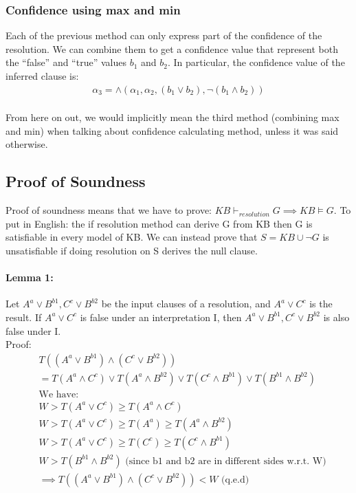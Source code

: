 \documentclass[part1.tex]{subfiles}
\begin{document}
\subsubsection{Confidence using max and min}
Each of the previous method can only express part of the confidence of the resolution. We can combine
them to get a confidence value that represent both the ``false'' and ``true'' values \(b_1\) and 
\(b_2\). In particular, the confidence value of the inferred clause is:
\begin{align*}
	{\alpha}_3 = \wedge({\alpha}_1, {\alpha}_2, (b_1 \vee b_2), \neg(b_1 \wedge b_2))
\end{align*}

\paragraph{}From here on out, we would implicitly mean the third method
(combining max and min) when talking about confidence calculating
method, unless it was said otherwise.


\subsection{Proof of Soundness}
Proof of soundness means that we have to prove: \(KB {\vdash}_{resolution} G \implies KB \models G\). To
put in English: the if resolution method can derive G from KB then G is satisfiable in every model of 
KB. We can instead prove that \(S = KB \cup \neg G\) is unsatisfiable if doing resolution on
S derives the null clause.\\

\paragraph{Lemma 1:} Let \(A^a \vee B^{b1}, C^c \vee B^{b2}\) be the input clauses of a resolution, and 
\(A^a \vee C^c\) is the result. If \(A^a \vee C^c\) is false under an interpretation I, then 
\(A^a \vee B^{b1}, C^c \vee B^{b2}\) is also false under I.\\
\indent Proof:
\begin{align*}
	&T((A^a \vee B^{b1}) \wedge (C^c \vee B^{b2}))\\
	&= T(A^a \wedge C^c) \vee T(A^a \wedge B^{b2}) \vee T(C^c \wedge B^{b1}) \vee T(B^{b1} \wedge 
	B^{b2})\\
	&\text{We have:}\\
	&W > T(A^a \vee C^c) \ge T(A^a \wedge C^c)\\
	&W > T(A^a \vee C^c) \ge T(A^a) \ge T(A^a \wedge B^{b2})\\
	&W > T(A^a \vee C^c) \ge T(C^c) \ge T(C^c \wedge B^{b1})\\
	&W > T(B^{b1} \wedge B^{b2}) \text{  (since b1 and b2 are in different sides w.r.t. W)}\\
	&\implies T((A^a \vee B^{b1}) \wedge (C^c \vee B^{b2})) < W \text{ (q.e.d)}
\end{align*}
\end{document}
